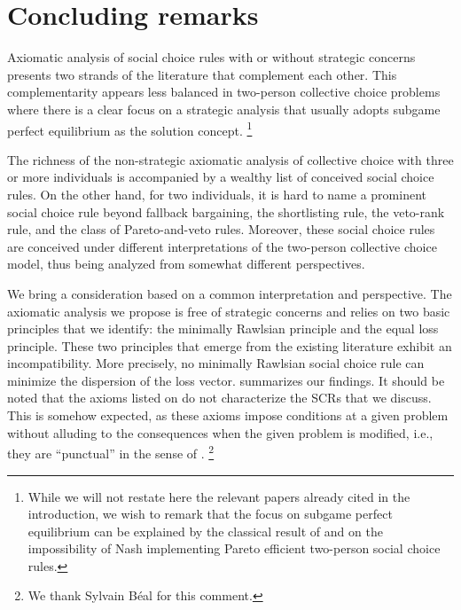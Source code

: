 \documentclass[version=3.21, pagesize, twoside=off, bibliography=totoc, DIV=calc, fontsize=12pt, a4paper]{scrartcl}
\begin{document}
\section{Concluding remarks}
\label{sec:concl}
Axiomatic analysis of social choice rules with or without strategic concerns presents two strands of the literature that complement each other. This complementarity appears less balanced in two-person collective choice problems where there is a clear focus on a strategic analysis that usually adopts subgame perfect equilibrium as the solution concept.%
\footnote{While we will not restate here the relevant papers already cited in the introduction, we wish to remark that the focus on subgame perfect equilibrium can be explained by the classical result of \citet{HurwiczSchmeidler78} and \citet{Maskin99} on the impossibility of Nash implementing Pareto efficient two-person social choice rules.} 

The richness of the non-strategic axiomatic analysis of collective choice with three or more individuals is accompanied by a wealthy list of conceived social choice rules. On the other hand, for two individuals, it is hard to name a prominent social choice rule beyond fallback bargaining, the shortlisting rule, the veto-rank rule, and the class of Pareto-and-veto rules. Moreover, these social choice rules are conceived under different interpretations of the two-person collective choice model, thus being analyzed from somewhat different perspectives.

We bring a consideration based on a common interpretation and perspective. The axiomatic analysis we propose is free of strategic concerns and relies on two basic principles that we identify: the minimally Rawlsian principle and the equal loss principle. These two principles that emerge from the existing literature exhibit an incompatibility. More precisely, no minimally Rawlsian social choice rule can minimize the dispersion of the loss vector.
 summarizes our findings. It should be noted that the axioms listed on  do not characterize the SCRs that we discuss. This is somehow expected, as these axioms impose conditions at a given problem without alluding to the consequences when the given problem is modified, i.e., they are “punctual” in the sense of \citet{thomson2012axiomatics}.%
\footnote{We thank Sylvain Béal for this comment.}
\end{document}
